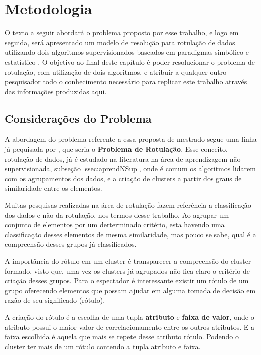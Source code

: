 \chapter{Metodologia} \label{cap:ferramentas}

O texto a seguir abordará o problema proposto por esse trabalho, e logo em seguida, será apresentado um modelo de resolução para rotulação de dados utilizando dois algoritmos supervisionados baseados em paradigmas simbólico e estatístico . O objetivo ao final deste capítulo é poder resolucionar o problema de rotulação, com utilização de dois algoritmos, e atribuir a qualquer outro pesquisador todo o conhecimento necessário para replicar este trabalho através das informações produzidas aqui.

\section{Considerações do Problema}\label{cap:ferramentas:sec:considproblema}

A abordagem do problema referente a essa proposta de mestrado segue uma linha já pequisada por , que seria o \textbf{Problema de Rotulação}. Esse conceito, rotulação de dados,  já é estudado na literatura na área de aprendizagem não-supervisionada, subseção \ref{ssec:aprendNSup}, onde é comum os algoritmos lidarem com os agrupamentos dos dados, e a criação de clusters a partir dos graus de  similaridade entre os elementos.

Muitas pesquisas realizadas na área de rotulação fazem referência a classificação dos dados e não da rotulação, nos termos desse trabalho. Ao agrupar um conjunto de elementos por um derterminado critério, esta havendo uma classificação desses elementos de mesma similaridade, mas pouco se sabe, qual é a compreensão desses grupos já classificados. 

A importância do rótulo em um cluster é transparecer a compreensão do cluster formado, visto que, uma vez os clusters já agrupados não fica claro o critério de criação desses grupos. Para o espectador é interessante existir um rótulo de um grupo oferecendo elementos que possam ajudar em alguma tomada de decisão em razão de seu significado (rótulo).

A criação do rótulo é a escolha de uma tupla \textbf{atributo} e \textbf{faixa de valor}, onde o atributo possui  o maior  valor de correlacionamento entre os outros atributos. E a faixa escolhida é aquela que  mais se repete desse atributo rótulo. Podendo o cluster ter mais de um rótulo contendo a tupla atributo e faixa.


